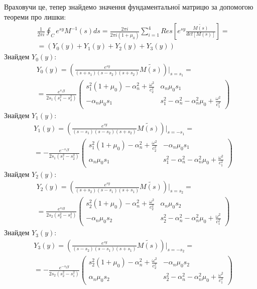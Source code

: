Враховучи це, тепер знайдемо значення фундаментальної матрицю за допомогою теореми про лишки:
\begin{align*}
    &\frac{1}{2\pi i} \oint_C e^{sy} M^{-1}(s)ds = \frac{2 \pi i}{2 \pi i (1 + \mu_0)} \sum_{i=1}^{4} Res\left[ e^{sy} \frac{\widetilde{M(s)}}{det[M(s)]} \right] = \\
    & = \left(Y_0(y) + Y_1(y) + Y_2(y) + Y_3(y) \right)
\end{align*}
Знайдем $Y_0(y)$:
\begin{align}
    &Y_0(y) =  \left( \frac{e^{sy}}{(s+s_1)(s - s_2)(s + s_2)} \widetilde{M(s)} \right) \Big|_{s=s_1} = \nonumber \\
    &=\frac{e^{s_1 y}}{2s_1 (s_1^2 - s_2^2)} \begin{pmatrix}
        s_1^2 (1 + \mu_0) -\alpha_n^2 + \frac{\omega^2}{c_2^2} & \alpha_n \mu_0 s_1 \\
        -\alpha_n \mu_0 s_1 & s_1^2 - \alpha_n^2 - \alpha_n^2\mu_0 + \frac{\omega^2}{c_1^2}
    \end{pmatrix}
\end{align}
Знайдем $Y_1(y)$:
\begin{align}
    &Y_1(y) =  \left( \frac{e^{sy}}{(s-s_1)(s - s_2)(s + s_2)} \widetilde{M(s)} \right) \Big|_{s=-s_1} = \nonumber \\
    &=-\frac{e^{-s_1 y}}{2s_1 (s_1^2 - s_2^2)} \begin{pmatrix}
        s_1^2 (1 + \mu_0) -\alpha_n^2 + \frac{\omega^2}{c_2^2} & -\alpha_n \mu_0 s_1 \\
        \alpha_n \mu_0 s_1 & s_1^2 - \alpha_n^2 - \alpha_n^2\mu_0 + \frac{\omega^2}{c_1^2}
    \end{pmatrix}
\end{align}
Знайдем $Y_2(y)$:
\begin{align}
    &Y_2(y) =  \left( \frac{e^{sy}}{(s+s_2)(s - s_1)(s + s_1)} \widetilde{M(s)} \right) \Big|_{s=s_2} = \nonumber \\
    &=\frac{e^{s_2 y}}{2s_2 (s_2^2 - s_1^2)} \begin{pmatrix}
        s_2^2 (1 + \mu_0) -\alpha_n^2 + \frac{\omega^2}{c_2^2} & \alpha_n \mu_0 s_2 \\
        -\alpha_n \mu_0 s_2 & s_2^2 - \alpha_n^2 - \alpha_n^2\mu_0 + \frac{\omega^2}{c_1^2}
    \end{pmatrix}
\end{align}
Знайдем $Y_3(y)$:
\begin{align}
    &Y_3(y) =  \left( \frac{e^{sy}}{(s-s_2)(s - s_1)(s + s_1)} \widetilde{M(s)} \right) \Big|_{s=-s_2} = \nonumber \\
    &=-\frac{e^{-s_2 y}}{2s_2 (s_2^2 - s_1^2)} \begin{pmatrix}
        s_2^2 (1 + \mu_0) -\alpha_n^2 + \frac{\omega^2}{c_2^2} & -\alpha_n \mu_0 s_2 \\
        \alpha_n \mu_0 s_2 & s_2^2 - \alpha_n^2 - \alpha_n^2\mu_0 + \frac{\omega^2}{c_1^2}
    \end{pmatrix}
\end{align}

